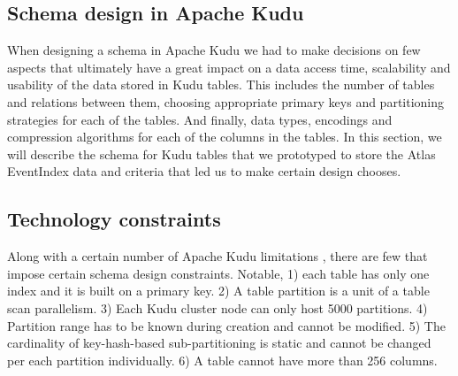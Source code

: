 \documentclass{webofc}
\begin{document}
\begin{linenumbers}
\section{Schema design in Apache Kudu}
\label{sec-5}
When designing a schema in Apache Kudu we had to make decisions on few aspects that ultimately have a great impact on a data access time, scalability and usability of the data stored in Kudu tables. This includes the number of tables and relations between them, choosing appropriate primary keys and partitioning strategies for each of the tables. And finally, data types, encodings and compression algorithms for each of the columns in the tables. \newline
In this section, we will describe the schema for Kudu tables that we prototyped to store the Atlas EventIndex data and criteria that led us to make certain design chooses.
\subsection{Technology constraints}
\label{sec-5-cons}
Along with a certain number of Apache Kudu limitations \cite{KuduLimitations}, there are few that impose certain schema design constraints. Notable, 1) each table has only one index and it is built on a primary key. 2) A table partition is a unit of a table scan parallelism. 3) Each Kudu cluster node can only host 5000 partitions. 4) Partition range has to be known during creation and cannot be modified. 5) The cardinality of key-hash-based sub-partitioning is static and cannot be changed per each partition individually. 6) A table cannot have more than 256 columns. 

\end{linenumbers}
\end{document}
